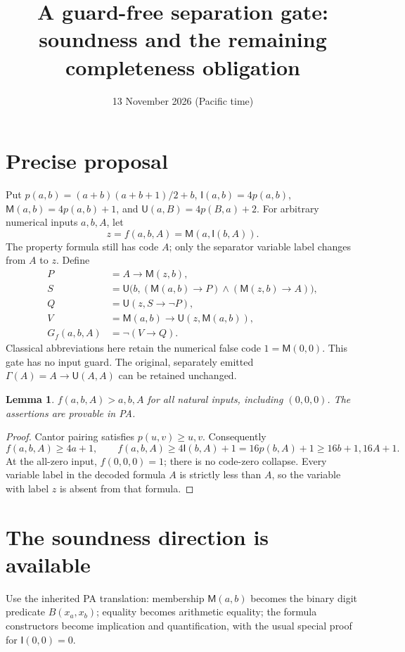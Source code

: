 \documentclass[11pt]{article}
\title{A guard-free separation gate: soundness and the remaining completeness obligation}
\date{13 November 2026 (Pacific time)}
\newtheorem{lemma}{Lemma}
\newcommand{\I}{\mathsf I}
\newcommand{\M}{\mathsf M}
\newcommand{\U}{\mathsf U}
\begin{document}
\maketitle
\section{Precise proposal}
Put $p(a,b)=(a+b)(a+b+1)/2+b$, $\I(a,b)=4p(a,b)$,
$\M(a,b)=4p(a,b)+1$, and $\U(a,B)=4p(B,a)+2$.
For arbitrary numerical inputs $a,b,A$, let
\[
 z=f(a,b,A)=\M(a,\I(b,A)).
\]
The property formula still has code $A$; only the separator variable label
changes from $A$ to $z$. Define
\begin{align*}
 P&=A\to\M(z,b),\\
 S&=\U\bigl(b,(\M(a,b)\to P)\wedge(\M(z,b)\to A)\bigr),\\
 Q&=\U(z,S\to\neg P),\\
 V&=\M(a,b)\to\U(z,\M(a,b)),\\
 G_f(a,b,A)&=\neg(V\to Q).
\end{align*}
Classical abbreviations here retain the numerical false code $1=\M(0,0)$.
This gate has no input guard. The original, separately emitted
$\Gamma(A)=A\to\U(A,A)$ can be retained unchanged.

\begin{lemma}
$f(a,b,A)>a,b,A$ for all natural inputs, including $(0,0,0)$.
The assertions are provable in PA.
\end{lemma}
\begin{proof}
Cantor pairing satisfies $p(u,v)\ge u,v$. Consequently
\[
 f(a,b,A)\ge4a+1,
 \qquad f(a,b,A)\ge4\I(b,A)+1=16p(b,A)+1
 \ge16b+1,16A+1.
\]
At the all-zero input, $f(0,0,0)=1$; there is no code-zero collapse.
Every variable label in the decoded formula $A$ is strictly less than $A$,
so the variable with label $z$ is absent from that formula.
\end{proof}

\section{The soundness direction is available}
Use the inherited PA translation: membership $\M(a,b)$ becomes the binary
digit predicate $B(x_a,x_b)$; equality becomes arithmetic equality; the
formula constructors become implication and quantification, with the
usual special proof for $\I(0,0)=0$.
\end{document}
